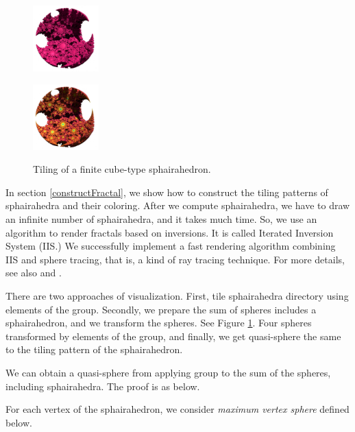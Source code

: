 \documentclass[suppldata, dvipdfmx]{interact}
\theoremstyle{plain}%
\theoremstyle{definition}
\theoremstyle{remark}
\theoremstyle{problemstyle}
\begin{document}
\begin{figure}[H]
\begin{minipage}[t]{0.18\textwidth}
  \centering
  \includegraphics[width=1in, height=1in, keepaspectratio]{./img/visualization/sphereStep10.png}
  \label{}
 \end{minipage}
 \hspace*{\fill}
 \begin{minipage}[t]{0.18\textwidth}
  \centering
  \includegraphics[width=1in, height=1in, keepaspectratio]{./img/visualization/sphereFinal.png}
  \label{}
 \end{minipage}
 \hspace*{\fill}
 \caption{Tiling of a finite cube-type sphairahedron.}
 \label{fig:visualizeSpheres}
\end{figure}

In section \ref{constructFractal}, we show how to construct the tiling
patterns of sphairahedra and their coloring.
After we compute sphairahedra, we have to draw an infinite number of
sphairahedra, and it takes much time.
So, we use an algorithm to render fractals based on
inversions. It is called Iterated Inversion System (IIS.)
We successfully implement a fast rendering algorithm
combining IIS and sphere tracing, that is, a kind of ray tracing technique.
For more details, see also \cite{bridges2017} and \cite{bridges2018}.

There are two approaches of visualization.
First, tile sphairahedra directory using elements of the group.
Secondly, we prepare the sum of spheres includes a sphairahedron, and we
transform the spheres.
See Figure \ref{fig:visualizeSpheres}.
Four spheres transformed by elements of the group, and finally, we get
quasi-sphere the same to the tiling pattern of the sphairahedron.

We can obtain a quasi-sphere from applying group to the sum of the spheres,
including sphairahedra. The proof is as below.

For each vertex of the sphairahedron, we consider \textit{maximum vertex
sphere} defined below.
\end{document}
